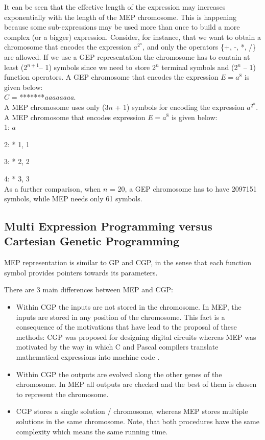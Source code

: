 \documentclass [11pt]{article}
\begin{document}
It can be seen that the effective length of the expression may increases 
exponentially with the length of the MEP chromosome. This is happening because 
some sub-expressions may be used more than once to build a more complex (or 
a bigger) expression. Consider, for instance, that we want to obtain a 
chromosome that encodes the expression $a^{2^n}$, and only the operators 
{\{}+, -, *, /{\}} are allowed. If we use a GEP representation the 
chromosome has to contain at least (2$^{n + 1 }$-- 1) symbols since we need 
to store 2$^{n}$ terminal symbols and (2$^{n}$ -- 1) function operators. A 
GEP chromosome that encodes the expression $E=a^{8}$ is given below:\\

$C$ = *******\textit{aaaaaaaa}.\\

A MEP chromosome uses only (3$n$ + 1) symbols for encoding the 
expression $a^{2^n}$. A MEP chromosome that encodes expression $E = a^{8}$ is 
given below:\\

1: $a$

2: * 1, 1

3: * 2, 2

4: * 3, 3\\

As a further comparison, when $n$ = 20, a GEP chromosome has to have 2097151 
symbols, while MEP needs only 61 symbols. 

\subsection{Multi Expression Programming versus Cartesian Genetic Programming}

MEP representation is similar to GP and CGP, in the sense that each function 
symbol provides pointers towards its parameters. 

There are 3 main differences between MEP and CGP:

\begin{itemize}

\item{Within CGP the inputs are not stored in the chromosome. In MEP, the inputs are stored in any position of the chromosome. This fact is a consequence of the motivations that have lead to the proposal of these methods: CGP was proposed  for designing digital circuits whereas MEP was motivated by the way in which C and Pascal compilers translate mathematical expressions into machine code \cite{aho1}.}

\item{Within CGP the outputs are evolved along the other genes of the chromosome. In MEP all outputs are checked and the best of them is chosen to represent the chromosome.}

\item{CGP stores a single solution / chromosome, whereas MEP stores multiple solutions in the same chromosome. Note, that both procedures have the same complexity which means the same running time.}

\end{itemize}
\end{document}
